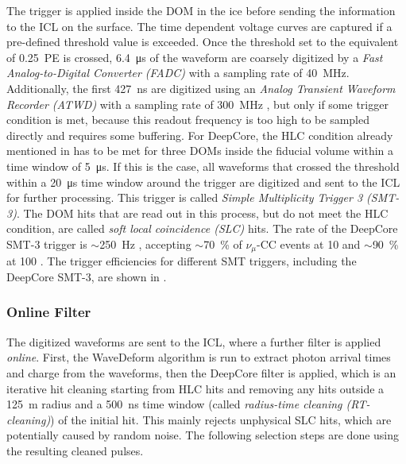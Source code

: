 The trigger is applied inside the DOM in the ice before sending the information to the ICL on the surface. The time dependent voltage curves are captured if a pre-defined threshold value is exceeded. Once the threshold set to the equivalent of \SI{0.25}{PE} is crossed, \SI{6.4}{\micro\second} of the waveform are coarsely digitized by a \textit{Fast Analog-to-Digital Converter (FADC)} with a sampling rate of \SI{40}{\mega\hertz}. Additionally, the first \SI{427}{\nano\second} are digitized using an \textit{Analog Transient Waveform Recorder (ATWD)} with a sampling rate of \SI{300}{\mega\hertz} , but only if some trigger condition is met, because this readout frequency is too high to be sampled directly and requires some buffering. For DeepCore, the HLC condition already mentioned in  has to be met for three DOMs inside the fiducial volume within a time window of \SI{5}{\micro\second}. If this is the case, all waveforms that crossed the threshold within a \SI{20}{\micro\second} time window around the trigger are digitized and sent to the ICL for further processing. This trigger is called \textit{Simple Multiplicity Trigger 3 (SMT-3)}. The DOM hits that are read out in this process, but do not meet the HLC condition, are called \textit{soft local coincidence (SLC)} hits. The rate of the DeepCore SMT-3 trigger is $\sim$\SI{250}{\hertz} , accepting $\sim$\SI{70}{\percent} of $\nu_\mu$-CC events at \SI{10}{\gev} and $\sim$\SI{90}{\percent} at \SI{100}{\gev} . The trigger efficiencies for different SMT triggers, including the DeepCore SMT-3, are shown in .


\subsubsection{Online Filter} 

The digitized waveforms are sent to the ICL, where a further filter is applied \textit{online}. First, the WaveDeform algorithm is run to extract photon arrival times and charge from the waveforms, then the DeepCore filter is applied, which is an iterative hit cleaning starting from HLC hits and removing any hits outside a \SI{125}{\meter} radius and a \SI{500}{\nano\second} time window (called \textit{radius-time cleaning (RT-cleaning)}) of the initial hit. This mainly rejects unphysical SLC hits, which are potentially caused by random noise. The following selection steps are done using the resulting cleaned pulses.

